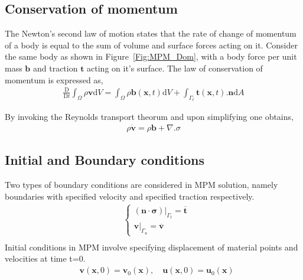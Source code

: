 \subsection{Conservation of momentum}
The Newton's second law of motion states that the rate of change of momentum of a body is equal to the sum of volume and surface forces acting on it. Consider the same body as shown in Figure~\ref{Fig:MPM_Dom}, with a body force per unit mass $\mathbf{b}$ and traction $\mathbf{t}$ acting on it's surface. The law of conservation of momentum is expressed as,
\begin{align}
\frac{\mathrm{D}}{\mathrm{D} t} \int_{\Omega} \rho \mathbf{v} \mathrm{d} V=\int_{\Omega} \rho \mathbf{b}(\mathbf{x},t) \mathrm{d} V + \int_{\Gamma_t} \mathbf{t}(\mathbf{x},t).\mathbf{n} \mathrm{d} A
\end{align}

By invoking the Reynolds transport theorum and upon simplifying one obtains,
\begin{align}
\rho \dot{\mathbf{v}} = \rho \mathbf{b} + \nabla . \sigma 
\end{align}


\subsection{Initial and Boundary conditions}
Two types of boundary conditions are considered in MPM solution, namely boundaries with specified velocity and specified traction respectively.
\begin{align}
& \left\{\begin{array}{l}
\left.(\boldsymbol{n} \cdot \boldsymbol{\sigma})\right|_{\Gamma_t}=\overline{\boldsymbol{t}} \\
\left.\boldsymbol{v}\right|_{\Gamma_u}=\overline{\boldsymbol{v}}
\end{array}\right. \\
\end{align}
Initial conditions in MPM involve specifying displacement of material points and velocities at time t=0.
\begin{align}
& \mathbf{v}(\mathbf{x}, 0)=\mathbf{v}_0(\mathbf{x}), \quad \mathbf{u}(\mathbf{x}, 0)=\mathbf{u}_0(\mathbf{x})
\end{align}

